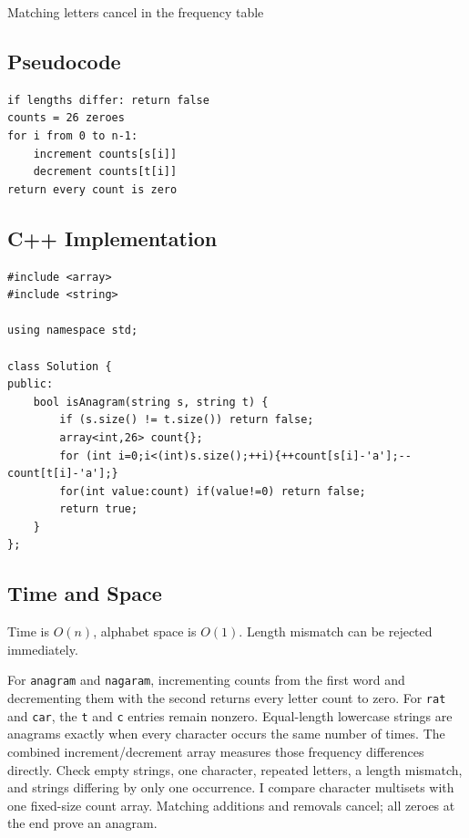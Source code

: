 \begin{visualbox}{Matching letters cancel in the frequency table}
\centering
{}
\end{visualbox}

\subsection{Pseudocode}
\begin{lstlisting}[style=pseudocode]
if lengths differ: return false
counts = 26 zeroes
for i from 0 to n-1:
    increment counts[s[i]]
    decrement counts[t[i]]
return every count is zero
\end{lstlisting}

\subsection{C++ Implementation}
\begin{lstlisting}[style=compactcode,caption={Complete C++ solution: Valid Anagram}]
#include <array>
#include <string>

using namespace std;

class Solution {
public:
    bool isAnagram(string s, string t) {
        if (s.size() != t.size()) return false;
        array<int,26> count{};
        for (int i=0;i<(int)s.size();++i){++count[s[i]-'a'];--count[t[i]-'a'];}
        for(int value:count) if(value!=0) return false;
        return true;
    }
};
\end{lstlisting}

\subsection{Time and Space}
Time is \(O(n)\), alphabet space is \(O(1)\). Length mismatch can be rejected
immediately.

\lessonexpansion
  {For \texttt{anagram} and \texttt{nagaram}, incrementing counts from the
   first word and decrementing them with the second returns every letter count
   to zero. For \texttt{rat} and \texttt{car}, the \texttt{t} and
   \texttt{c} entries remain nonzero.}
  {Equal-length lowercase strings are anagrams exactly when every character
   occurs the same number of times. The combined increment/decrement array
   measures those frequency differences directly.}
  {Check empty strings, one character, repeated letters, a length mismatch,
   and strings differing by only one occurrence.}
  {I compare character multisets with one fixed-size count array. Matching
   additions and removals cancel; all zeroes at the end prove an anagram.}

